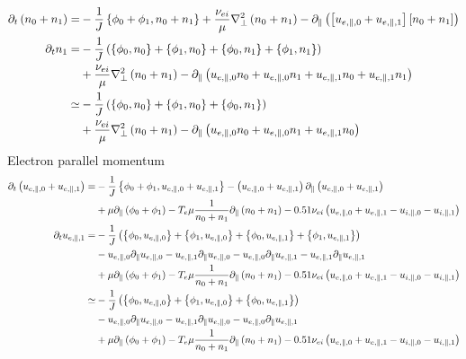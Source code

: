 \begin{align*}
 \partial_t \left( n_0+n_1 \right)
 =&
 -\frac{1}{J}\left\{\phi_0 + \phi_1,n_0+n_1\right\}
 +\frac{\nu_{ei}}{\mu} \nabla_\perp^2 \left( n_0+n_1 \right)
-  \partial_\| \left( \left[ u_{e,\|,0} +u_{e,\|,1} \right]
\left[ n_0+ n_1 \right]
\right)
\\
\partial_t n_1
 =&
 -\frac{1}{J}\left(
   \left\{\phi_0,n_0\right\}
 + \left\{\phi_1,n_0\right\}
 + \left\{\phi_0,n_1\right\}
 + \left\{\phi_1,n_1\right\}
 \right)
 \\&
 +\frac{\nu_{ei}}{\mu} \nabla_\perp^2 \left( n_0+n_1 \right)
-  \partial_\| \left(
 u_{e,\|,0} n_0+u_{e,\|,0} n_1  + u_{e,\|,1} n_0+ u_{e,\|,1}n_1
\right)
\\
\simeq&
 -\frac{1}{J}\left(
   \left\{\phi_0,n_0\right\}
 + \left\{\phi_1,n_0\right\}
 + \left\{\phi_0,n_1\right\}
 \right)
 \\&
 +\frac{\nu_{ei}}{\mu} \nabla_\perp^2 \left( n_0+n_1 \right)
-  \partial_\| \left(
u_{e,\|,0} n_0+u_{e,\|,0} n_1  + u_{e,\|,1} n_0
\right)
\end{align*}
Electron parallel momentum
\begin{align*}
\partial_t
\left( u_{e,\|,0} + u_{e,\|,1} \right)
 =&
 -\frac{1}{J}\left\{ \phi_0 + \phi_1 , u_{e,\|,0} + u_{e,\|,1} \right\}
 -
\left( u_{e,\|,0} + u_{e,\|,1} \right)
 \partial_\|
\left( u_{e,\|,0} + u_{e,\|,1} \right)
\\&
+ \mu \partial_\| \left( \phi_0 + \phi_1 \right)
-
T_e \mu \frac{1}{ n_0 + n_1 }\partial_\| \left( n_0 + n_1 \right)
 - 0.51 \nu_{ei} \left(
 u_{e,\|,0} + u_{e,\|,1}
 -
 u_{i,\|,0} - u_{i,\|,1}
 \right)
 \\
 \partial_t u_{e,\|,1}
 =&
 -\frac{1}{J}\left(
   \left\{\phi_0,u_{e,\|,0}\right\}
 + \left\{\phi_1,u_{e,\|,0}\right\}
 + \left\{\phi_0,u_{e,\|,1}\right\}
 + \left\{\phi_1,u_{e,\|,1}\right\}
 \right)
\\&
 - u_{e,\|,0} \partial_\| u_{e,\|,0}
 - u_{e,\|,1} \partial_\| u_{e,\|,0}
 - u_{e,\|,0} \partial_\| u_{e,\|,1}
 - u_{e,\|,1} \partial_\| u_{e,\|,1}
\\&
+ \mu \partial_\| \left( \phi_0 + \phi_1 \right)
-
T_e \mu \frac{1}{ n_0 + n_1 }\partial_\| \left( n_0 + n_1 \right)
 - 0.51 \nu_{ei} \left(
 u_{e,\|,0} + u_{e,\|,1}
 -
 u_{i,\|,0} - u_{i,\|,1}
 \right)
 \\
 \simeq&
 -\frac{1}{J}\left(
   \left\{\phi_0,u_{e,\|,0}\right\}
 + \left\{\phi_1,u_{e,\|,0}\right\}
 + \left\{\phi_0,u_{e,\|,1}\right\}
 \right)
\\&
 - u_{e,\|,0} \partial_\| u_{e,\|,0}
 - u_{e,\|,1} \partial_\| u_{e,\|,0}
 - u_{e,\|,0} \partial_\| u_{e,\|,1}
\\&
+ \mu \partial_\| \left( \phi_0 + \phi_1 \right)
-
T_e \mu \frac{1}{ n_0 + n_1 }\partial_\| \left( n_0 + n_1 \right)
 - 0.51 \nu_{ei} \left(
 u_{e,\|,0} + u_{e,\|,1}
 -
 u_{i,\|,0} - u_{i,\|,1}
 \right)
\end{align*}
